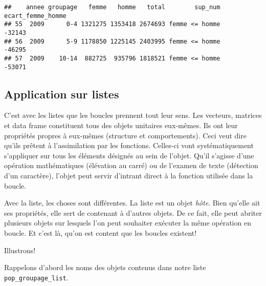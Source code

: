 \documentclass[]{book}
\newenvironment{Shaded}{\begin{snugshade}}{\end{snugshade}}
\newcommand{\KeywordTok}[1]{\textcolor[rgb]{0.13,0.29,0.53}{\textbf{#1}}}
\newcommand{\DataTypeTok}[1]{\textcolor[rgb]{0.13,0.29,0.53}{#1}}
\newcommand{\DecValTok}[1]{\textcolor[rgb]{0.00,0.00,0.81}{#1}}
\newcommand{\StringTok}[1]{\textcolor[rgb]{0.31,0.60,0.02}{#1}}
\newcommand{\OperatorTok}[1]{\textcolor[rgb]{0.81,0.36,0.00}{\textbf{#1}}}
\newcommand{\NormalTok}[1]{#1}
\begin{document}
\begin{Shaded}
\end{Shaded}

\begin{verbatim}
##    annee groupage   femme   homme   total        sup_num ecart_femme_homme
## 55  2009      0-4 1321275 1353418 2674693 femme <= homme            -32143
## 56  2009      5-9 1178850 1225145 2403995 femme <= homme            -46295
## 57  2009    10-14  882725  935796 1818521 femme <= homme            -53071
\end{verbatim}

\subsection{Application sur listes}\label{application-sur-listes}

C'est avec les listes que les boucles prennent tout leur sens. Les
vecteurs, matrices et data frame constituent tous des objets unitaires
eux-mêmes. Ils ont leur propriétés propres à eux-mêmes (structure et
comportements). Ceci veut dire qu'ils prêtent à l'assimilation par les
fonctions. Celles-ci vont systématiquement s'appliquer sur tous les
éléments désignés au sein de l'objet. Qu'il s'agisse d'une opération
mathématiques (élévation au carré) ou de l'examen de texte (détection
d'un caractère), l'objet peut servir d'intrant direct à la fonction
utilisée dans la boucle.

Avec la liste, les choses sont différentes. La liste est un objet
\emph{hôte}. Bien qu'elle ait ses propriétés, elle sert de contenant à
d'autres objets. De ce fait, elle peut abriter plusieurs objets sur
lesquels l'on peut souhaiter exécuter la même opération en boucle. Et
c'est là, qu'on est content que les boucles existent!

Illustrons!

Rappelons d'abord les noms des objets contenus dans notre liste
\texttt{pop\_groupage\_list}.
\end{document}
